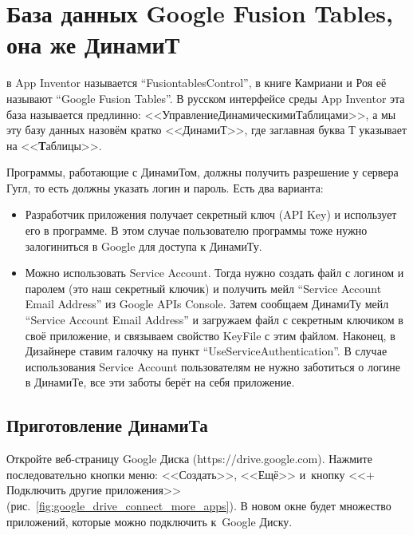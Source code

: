 \chapter{База данных Google Fusion Tables, она же ДинамиТ}
\label{ch:dynamite}


 в App Inventor называется ``FusiontablesControl'', 
в книге Камриани и Роя\cite{KamrianiAndRoy2016} её называют ``Google Fusion Tables''. 
В русском интерфейсе среды App Inventor эта база называется предлинно: 
<<УправлениеДинамическимиТаблицами>>, а мы эту базу данных назовём кратко <<ДинамиТ>>, 
где заглавная буква Т указывает на <<\textbf{Т}аблицы>>.

Программы, работающие с ДинамиТом, должны получить разрешение у сервера Гугл, то есть должны указать логин и пароль. Есть два варианта:
\begin{itemize}
    \item Разработчик приложения получает секретный ключ (API Key) и использует его в программе. 
        В этом случае пользователю программы тоже нужно залогиниться в Google для доступа к ДинамиТу. 

    \item Можно использовать Service Account. Тогда нужно создать 
        файл с логином и паролем (это наш секретный ключик) и получить 
        мейл ``Service Account Email Address'' из Google APIs Console. 
        Затем сообщаем ДинамиТу мейл ``Service Account Email Address'' 
        и загружаем файл с секретным ключиком в своё приложение, 
        и связываем свойство KeyFile с этим файлом. 
        Наконец, в Дизайнере ставим галочку на пункт ``UseServiceAuthentication''. 
        В случае использования Service Account 
        пользователям не нужно заботиться о логине в ДинамиТе, 
        все эти заботы берёт на себя приложение.
\end{itemize}




\section{Приготовление ДинамиТа}


Откройте веб-страницу Google Диска (https://drive.google.com).
Нажмите последовательно 
кнопки меню: <<Создать>>, <<Ещё>> и~кнопку <<+ Подключить другие приложения>> 
(рис.~\ref{fig:google_drive_connect_more_apps}). В новом окне будет множество 
приложений, которые можно подключить к~Google Диску. 

